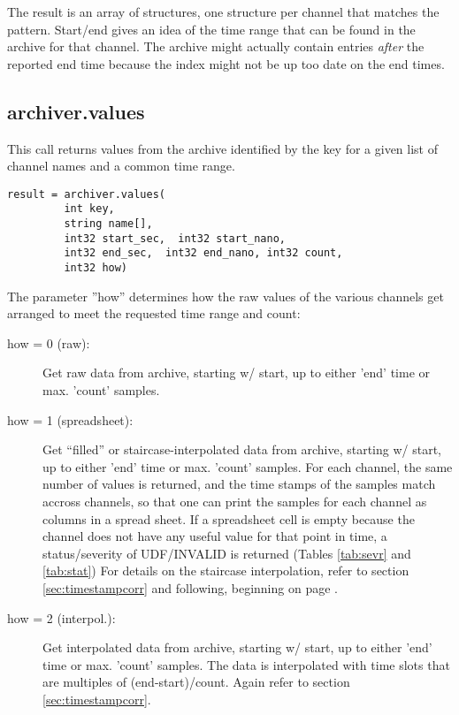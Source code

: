\noindent The result is an array of structures,  one structure
per channel that matches the pattern.
Start/end gives an idea of the time range that can
be found in the archive for that channel.
The archive might actually contain entries \emph{after}
the reported end time because the index might not
be up too date on the end times.

\subsection{archiver.values} %
This call returns values from the archive identified by the key for a
given list of channel names and a common time range.

\begin{lstlisting}[keywordstyle=\sffamily]
result = archiver.values(
         int key, 
         string name[], 
         int32 start_sec,  int32 start_nano,
         int32 end_sec,  int32 end_nano, int32 count,
         int32 how)
\end{lstlisting}

\noindent The parameter ''how'' determines how the raw values of the various
channels get arranged to meet the requested time range and count:
\begin{description}
\item[\sffamily how = 0 (raw):]
  Get raw data from archive,  starting w/ start,
  up to either 'end' time or max. 'count' samples.
\item[\sffamily how = 1 (spreadsheet):]
  Get ``filled'' or staircase-interpolated data from archive, starting
  w/ start, up to either 'end' time or max. 'count' samples.
  For each channel, the same number of values is returned, and the
  time stamps of the samples match accross channels, so that one can
  print the samples for each channel as columns in a spread sheet.
  If a spreadsheet cell is empty because the channel does not have any
  useful value for that point in time, a status/severity of
  UDF/INVALID is returned (Tables \ref{tab:sevr} and \ref{tab:stat})
  For details on the staircase interpolation, refer to section \ref{sec:timestampcorr} and following, beginning on page \pageref{sec:timestampcorr}.
\item[\sffamily how = 2 (interpol.):]
  Get interpolated data from archive, starting w/ start,
  up to either 'end' time or max. 'count' samples.
  The data is interpolated with time slots that are multiples
  of (end-start)/count. Again refer to section \ref{sec:timestampcorr}.
\end{description}

